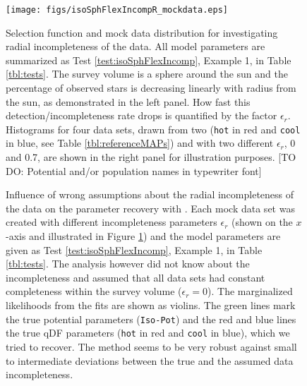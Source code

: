 
\begin{figure}
\texttt{[image: figs/isoSphFlexIncompR\_mockdata.eps]}
\caption{Selection function and mock data distribution for investigating radial incompleteness of the data. All model parameters are summarized as Test \ref{test:isoSphFlexIncomp}, Example 1, in Table \ref{tbl:tests}. The survey volume is a sphere around the sun and the percentage of observed stars is decreasing linearly with radius from the sun, as demonstrated in the left panel. How fast this detection/incompleteness rate drops is quantified by the factor $\epsilon_r$. Histograms for four data sets, drawn from two \MAPs{} (\texttt{hot} in red and \texttt{cool} in blue, see Table \ref{tbl:referenceMAPs}) and with two different $\epsilon_r$, 0 and 0.7, are shown in the right panel for illustration purposes. [TO DO: Potential and/or population names in typewriter font]} 
\label{fig:isoSphFlexIncompR_mockdata}
\end{figure}


\begin{figure}
\centering
{}
\caption{Influence of wrong assumptions about the radial incompleteness of the data on the parameter recovery with \RM{}. Each mock data set was created with different incompleteness parameters $\epsilon_r$ (shown on the $x$-axis and illustrated in Figure \ref{fig:isoSphFlexIncompR_mockdata}) and the model parameters are given as Test \ref{test:isoSphFlexIncomp}, Example 1, in Table \ref{tbl:tests}. The analysis however did not know about the incompleteness and assumed that all data sets had constant completeness within the survey volume ($\epsilon_r = 0$). The marginalized likelihoods from the fits are shown as violins. The green lines mark the true potential parameters (\texttt{Iso-Pot}) and the red and blue lines the true qDF parameters (\texttt{hot} \MAP in red and \texttt{cool} \MAP in blue), which we tried to recover. The \RM{} method seems to be very robust against small to intermediate deviations between the true and the assumed data incompleteness. } 
\label{fig:isoSphFlexIncompR_violins}
\end{figure}

